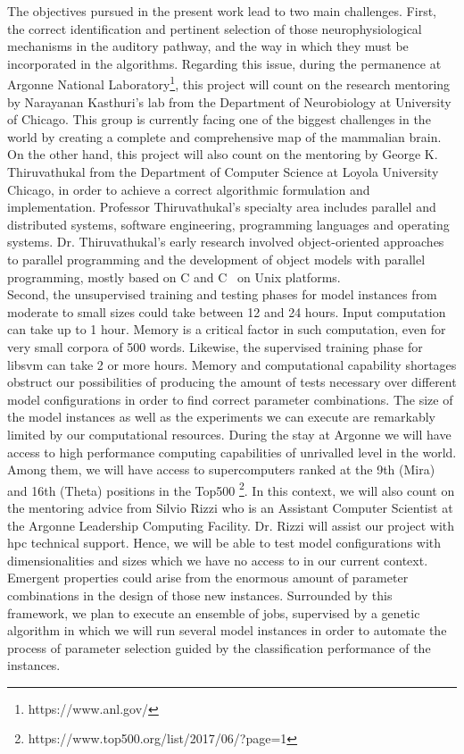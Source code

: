 \documentclass[11pt,a4paper]{article}
\newcommand{\CC}{C\nolinebreak\hspace{-.05em}\raisebox{.4ex}{\tiny\bf +}\nolinebreak\hspace{-.10em}\raisebox{.4ex}{\tiny\bf +}}
\begin{document}
The objectives pursued in the present work lead to two main challenges.
First, the correct identification and pertinent selection of those neurophysiological
mechanisms in the auditory pathway, and the way in which they must be incorporated
in the algorithms.
Regarding this issue, during the permanence at Argonne National Laboratory\footnote{https://www.anl.gov/},
this project will count on the
research mentoring by Narayanan Kasthuri's lab
from the Department of Neurobiology at University of Chicago.
This group is currently facing one of the biggest challenges in the world by 
creating a complete and comprehensive map of the mammalian brain.
On the other hand, this project will also count on the mentoring by
George K. Thiruvathukal from the Department of Computer Science at
Loyola University Chicago,
in order to achieve a correct algorithmic formulation and implementation.
Professor Thiruvathukal's specialty area includes
parallel and distributed systems, software engineering, programming languages and operating systems.
Dr. Thiruvathukal's early research involved object-oriented approaches to parallel programming
and the development of object models with parallel programming, mostly based on C and \CC
~on Unix platforms. \\

Second, the
unsupervised training and testing phases for model instances from moderate to small sizes
could take between 12 and 24 hours.
Input computation can take up to 1 hour.
Memory is a critical factor in such computation,
even for very small corpora of 500 words.
Likewise, the supervised training phase for \gls{libsvm} can take 2 or more hours.
Memory and computational capability shortages obstruct our possibilities of producing
the amount of tests necessary over different model configurations in order to find correct
parameter combinations.
The size of the model instances as well as the experiments we can execute
are remarkably limited by our computational resources.
During the stay at Argonne we will have access
to high performance computing capabilities of unrivalled level in the world.
Among them, we will have access to supercomputers
ranked at the 9th (Mira) and 16th (Theta) positions in the Top500
\footnote{https://www.top500.org/list/2017/06/?page=1}.
In this context, we will also count on the mentoring advice from Silvio Rizzi
who is an Assistant Computer Scientist at the Argonne Leadership Computing Facility.
Dr. Rizzi will assist our project with \gls{hpc} technical support.
Hence, we will be able to test model configurations
with dimensionalities and sizes which we have no access to in our current context.
Emergent properties could arise from the enormous amount of parameter combinations in the design
of those new instances.
Surrounded by this framework, we plan to execute an ensemble of jobs,
supervised by a genetic algorithm in which we will run several model instances
in order to automate the process of parameter selection guided by the
classification performance of the instances. \\
\end{document}

